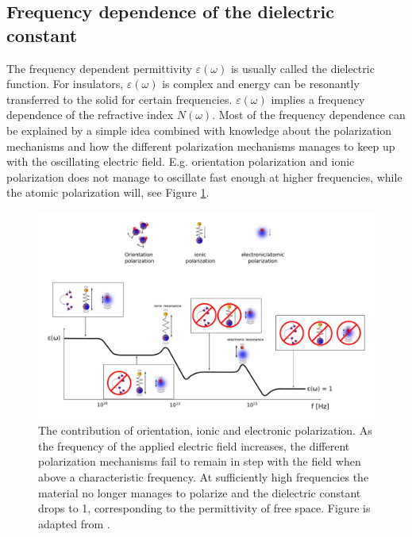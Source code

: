 \subsection{Frequency dependence of the dielectric constant}
The frequency dependent permittivity  $\varepsilon (\omega)$ is usually called the dielectric function.
For insulators, $\varepsilon(\omega)$ is complex and energy can be resonantly transferred to the solid
for certain frequencies. $\varepsilon(\omega)$ implies a frequency dependence of the refractive
index $N(\omega)$. Most of the frequency dependence can be explained by a simple idea 
combined with knowledge about the polarization mechanisms and how the different polarization mechanisms
manages to keep up with the oscillating electric field. E.g. orientation polarization and ionic polarization
does not manage to oscillate fast enough at higher frequencies, while the atomic polarization will, see
Figure \ref{fig:polarizationContribution}.
%
\begin{figure}[h!]
  \centering
   \includegraphics[width=1.0\textwidth]{Figures/polarizationContributionToPermittivity.pdf}
   \caption{ 
      The contribution of orientation, ionic and electronic polarization. As the frequency
      of the applied electric field increases, the different polarization mechanisms fail to remain in 
      step with the field when above a characteristic frequency. At sufficiently high 
      frequencies the material no longer manages to polarize and the dielectric constant drops 
      to 1, corresponding to the permittivity of free space. Figure is adapted from 
      \cite{cambdridgePermittivityPage}.
   }
   \label{fig:polarizationContribution}
\end{figure}
%
\\
\\
